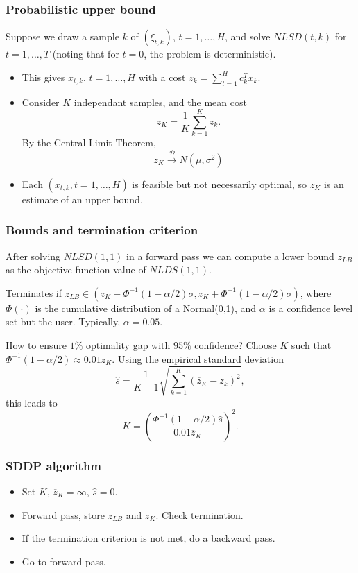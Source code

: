 \documentclass{beamer}
\begin{document}
\begin{frame}
\frametitle{Probabilistic upper bound}

Suppose we draw a sample $k$ of $(\xi_{t,k})$, $t = 1,\ldots,H$, and solve $NLSD(t, k)$ for $t = 1,\ldots,T$ (noting that for $t = 0$, the problem is deterministic).
\begin{itemize}
\item
This gives $x_{t,k}$, $t = 1,\ldots,H$ with a  cost $z_k = \sum_{t=1}^H c_k^Tx_k$.
\item
Consider $K$ independant samples, and the mean cost
$$
\overline{z}_K = \frac{1}{K} \sum_{k=1}^K z_k.
$$
By the Central Limit Theorem,
$$
\overline{z}_K \overset{\mathcal{D}}{\rightarrow} N(\mu, \sigma^2)
$$
\item
Each $(x_{t,k}, t = 1,\ldots,H)$ is feasible but not necessarily
optimal, so $\overline{z}_K$ is an estimate of an upper bound.
\end{itemize}

\end{frame}

\begin{frame}
\frametitle{Bounds and termination criterion}

After solving $NLSD(1, 1)$ in a forward pass we can compute a lower bound $z_{LB}$
as the objective function value of $NLDS(1, 1)$.

\mbox{}

Terminates if $z_{LB} \in (\overline{z}_K - \Phi^{-1}(1-\alpha/2) \sigma, \overline{z}_K + \Phi^{-1}(1-\alpha/2) \sigma)$, where $\Phi(\cdot)$ is the cumulative distribution of a Normal(0,1), and $\alpha$ is a confidence level set but the user. Typically, $\alpha = 0.05$.

\mbox{}

How to ensure $1\%$ optimality gap with $95\%$ confidence?
Choose $K$ such that $\Phi^{-1}(1-\alpha/2) \approx 0.01 \overline{z}_K$. Using the empirical standard deviation
$$
\hat{s} = \frac{1}{K-1} \sqrt{\sum_{k=1}^K (\overline{z}_K-z_k)^2},
$$
this leads to
$$
K = \left( \frac{\Phi^{-1}(1-\alpha/2)\hat{s}}{0.01 \overline{z}_K}\right)^2.
$$

\end{frame}

\begin{frame}
\frametitle{SDDP algorithm}

\begin{itemize}
\item
Set $K$, $\overline{z}_K = \infty$, $\hat{s} = 0$.
\item 
Forward pass, store $z_{LB}$ and $\overline{z}_K$.
Check termination.
\item
If the termination criterion is not met, do a backward pass.
\item 
Go to forward pass.
\end{itemize}

\end{frame}
\end{document}
